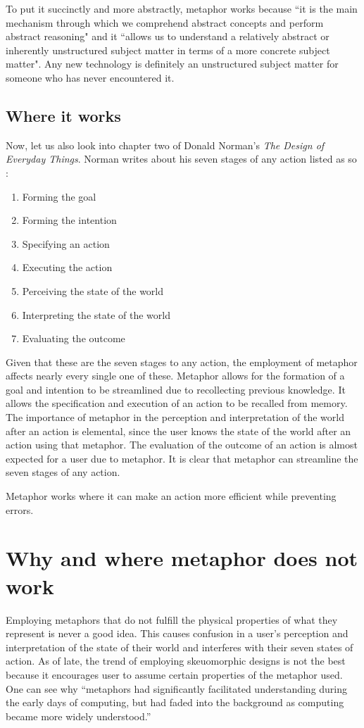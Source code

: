 \documentclass[11pt, oneside]{article}
\begin{document}
To put it succinctly and more abstractly, metaphor works because ``it is the main mechanism through which we comprehend abstract concepts and perform abstract reasoning" and it ``allows us to understand a relatively abstract or inherently unstructured subject matter in terms of a more concrete subject matter".\cite{metaphor-theory-practice} Any new technology is definitely an unstructured subject matter for someone who has never encountered it.

\subsection{Where it works}
Now, let us also look into chapter two of Donald Norman's \textit{The Design of Everyday Things}. Norman writes about his seven stages of any action listed as so \cite{norman-seven-stages}:
\begin{enumerate}
\item Forming the goal
\item Forming the intention
\item Specifying an action
\item Executing the action
\item Perceiving the state of the world
\item Interpreting the state of the world
\item Evaluating the outcome
\end{enumerate}

Given that these are the seven stages to any action, the employment of metaphor affects nearly every single one of these. Metaphor allows for the formation of a goal and intention to be streamlined due to recollecting previous knowledge. It allows the specification and execution of an action to be recalled from memory. The importance of metaphor in the perception and interpretation of the world after an action is elemental, since the user knows the state of the world after an action using that metaphor. The evaluation of the outcome of an action is almost expected for a user due to metaphor. It is clear that metaphor can streamline the seven stages of any action.

Metaphor works where it can make an action more efficient while preventing errors.

\section{Why and where metaphor does not work}
Employing metaphors that do not fulfill the physical properties of what they represent is never a good idea. This causes confusion in a user's perception and interpretation of the state of their world and interferes with their seven states of action. As of late, the trend of employing skeuomorphic designs is not the best because it encourages user to assume certain properties of the metaphor used. One can see why ``metaphors had significantly facilitated understanding during the early days of computing, but had faded into the background as computing became more widely understood.'' \cite{metaphor-theory-practice}
\end{document}
